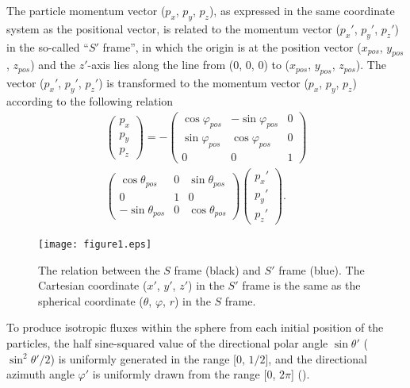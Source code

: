 \documentclass{jkas}
\begin{document}
The particle momentum vector ($p_x$, $p_y$, $p_z$), as expressed in the same coordinate system as the positional vector, is related to the momentum vector ($p_x'$, $p_y'$, $p_z'$) in the so-called “$S'$ frame”, in which the origin is at the position vector ($x_{pos}$, $y_{pos}$, $z_{pos}$) and the $z'$-axis lies along the line from ($0$, $0$, $0$) to ($x_{pos}$, $y_{pos}$, $z_{pos}$). The vector ($p_x'$, $p_y'$, $p_z'$) is transformed to the momentum vector ($p_x$, $p_y$, $p_z$) according to the following relation
%
\begin{eqnarray}
\label{eq:momentmat}
\left(\begin{array}{l}p_x\\p_y\\p_z\end{array}\right) = - \left(\begin{array}{ccc} \cos\varphi_{pos} & -\sin\varphi_{pos} & {0} \\ \sin\varphi_{pos} & \cos\varphi_{pos} & {0} \\ {0} & {0} & {1} \end{array} \right) \nonumber\\ \left(\begin{array}{ccc} \cos\theta_{pos} & {0} & \sin\theta_{pos} \\ {0} & {1} & {0} \\ -\sin\theta_{pos} & {0} & \cos\theta_{pos} \end{array} \right)
\left(\begin{array}{l}p_x'\\p_y'\\p_z'\end{array}\right).
\end{eqnarray}
%

\begin{figure}[t!]
\centering
\texttt{[image: figure1.eps]}
\caption{The relation between the $S$ frame (black) and $S'$ frame (blue). The Cartesian coordinate ($x'$, $y'$, $z'$) in the $S'$ frame is the same as the spherical coordinate ($\theta$, $\varphi$, $r$) in the $S$ frame.\label{fig:fig1}}
\end{figure}

To produce isotropic fluxes within the sphere from each initial position of the particles, the half sine-squared value of the directional polar angle $\sin\theta'$ ($\sin^2\theta'/2$) is uniformly generated in the range [$0$, $1/2$], and the directional azimuth angle $\varphi'$ is uniformly drawn from the range [$0$, $2\pi$] (\citealt{zhao2013}).
\end{document}
